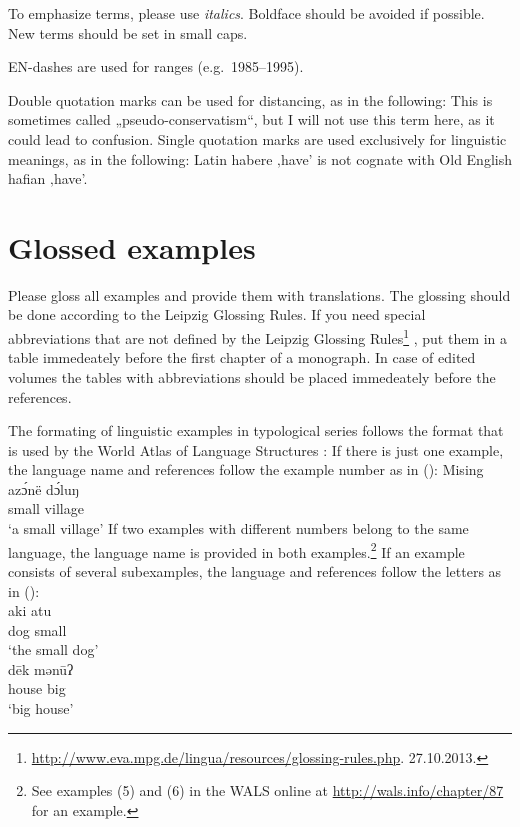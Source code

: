 To emphasize terms, please use \emph{italics}. Boldface should be avoided if
possible. New terms should be set in {\sc small caps}.

EN-dashes are used for ranges (e.g.\ 1985–1995).

Double quotation marks can be used for distancing, as in the following:
\ea
This is sometimes called „pseudo-conservatism“, but I will not use this term here, as it could lead
to confusion.
\z
Single quotation marks are used exclusively for linguistic meanings, as in the following:
\ea
Latin habere ‚have’ is not cognate with Old English hafian ‚have’.
\z

\section{Glossed examples}

Please gloss all examples and provide them with translations. The glossing should be done according
to the Leipzig Glossing Rules. If you need special abbreviations that are not defined by the Leipzig
Glossing Rules\footnote{
\url{http://www.eva.mpg.de/lingua/resources/glossing-rules.php}. 27.10.2013.
}
, put them in a table immedeately before the first chapter of a
monograph. In case of edited volumes the tables with abbreviations should be placed immedeately
before the references.

The formating of linguistic examples in typological series follows the format that is used by the
World Atlas of Language Structures \citep{DM2013a-ed}: If there is just one example, the language name and references
follow the example number as in ():
{\def\exfont{\normalsize\itshape}
\ea\label{ex-typology}
{\rm Mising \citep[69]{Prasad91a}}\\
\gll azɔ́në dɔ́luŋ\\
     small village\\ 
\glt `a small village' 
\z
If two examples with different numbers belong to the same language, the language name is provided in
both examples.\footnote{
  See examples (5) and (6) in the WALS online at \url{http://wals.info/chapter/87} for an example.
}
If an example consists of several subexamples, the language and references follow the letters as in
():
\eal
{}\\
\gll aki atu\\ 
     dog small\\ 
\glt ‘the small dog’ 
\\ 
\gll dēk mənūʔ\\
     house big\\
\glt ‘big house’ 
\zl
}

